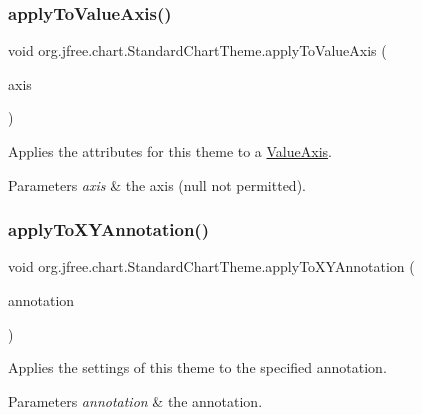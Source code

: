 \subsubsection{\texorpdfstring{apply\+To\+Value\+Axis()}{applyToValueAxis()}}
{\footnotesize\ttfamily void org.\+jfree.\+chart.\+Standard\+Chart\+Theme.\+apply\+To\+Value\+Axis (\begin{DoxyParamCaption}\item[{\mbox{\hyperlink{classorg_1_1jfree_1_1chart_1_1axis_1_1_value_axis}{Value\+Axis}}}]{axis }\end{DoxyParamCaption})\hspace{0.3cm}{\ttfamily [protected]}}

Applies the attributes for this theme to a \mbox{\hyperlink{}{Value\+Axis}}.


\begin{DoxyParams}{Parameters}
{\em axis} & the axis ({\ttfamily null} not permitted). \\
\hline
\end{DoxyParams}
\mbox{\label{classorg_1_1jfree_1_1chart_1_1_standard_chart_theme_ad9eadb695bdcb77bb0af40678c41b848}} 
\subsubsection{\texorpdfstring{apply\+To\+X\+Y\+Annotation()}{applyToXYAnnotation()}}
{\footnotesize\ttfamily void org.\+jfree.\+chart.\+Standard\+Chart\+Theme.\+apply\+To\+X\+Y\+Annotation (\begin{DoxyParamCaption}\item[{\mbox{\hyperlink{interfaceorg_1_1jfree_1_1chart_1_1annotations_1_1_x_y_annotation}{X\+Y\+Annotation}}}]{annotation }\end{DoxyParamCaption})\hspace{0.3cm}{\ttfamily [protected]}}

Applies the settings of this theme to the specified annotation.


\begin{DoxyParams}{Parameters}
{\em annotation} & the annotation. \\
\hline
\end{DoxyParams}
\mbox{\label{classorg_1_1jfree_1_1chart_1_1_standard_chart_theme_a0f9789c48f6cdc9565b0b6bcf2bc8e77}} 
